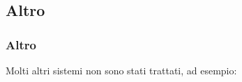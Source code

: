 \subsection{Altro}
\begin{frame}\frametitle{Altro}
Molti altri sistemi non sono stati trattati, ad esempio:\vspace{-10pt}
\begin{columns}
\begin{figure}{}\end{figure}
\begin{figure}{}\end{figure}
\end{columns}
\begin{figure}{}\end{figure}

\end{frame}
